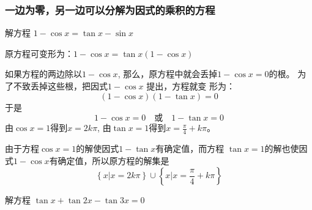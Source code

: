 \subsubsection{一边为零，另一边可以分解为因式的乘积的方程}
\begin{example}
    解方程
$1-\cos x =\tan x-\sin x$
\end{example}

\begin{solution}
    原方程可变形为：$1-\cos x =\tan x(1-\cos x)$

    如果方程的两边除以$1-\cos x$, 那么，原方程中就会丢掉$1-\cos x=0$的根。
为了不致丢掉这些根，把因式$1-\cos x$
提出，方程就变
形为：
\[(1-\cos x)(1-\tan x)=0\]
于是
$$1-\cos x=0\quad  \text{或}\quad 1-\tan x=0$$
由$\cos x=1$得到$x=2k\pi$, 由$\tan x=1$得到$x=\frac{\pi}{4}+k\pi$。

由于方程$\cos x=1$的解使因式$1-\tan x$有确定值，而方程
$\tan x=1$的解也使因式$1-\cos x$有确定值，所以原方程的解集是
\[\left\{x\big|x=2k\pi\right\}\cup \left\{x\big|x=\frac{\pi}{4}+k\pi\right\}\]
\end{solution}


\begin{example}
    解方程 $\tan x+\tan 2x-\tan 3x=0$
\end{example}

